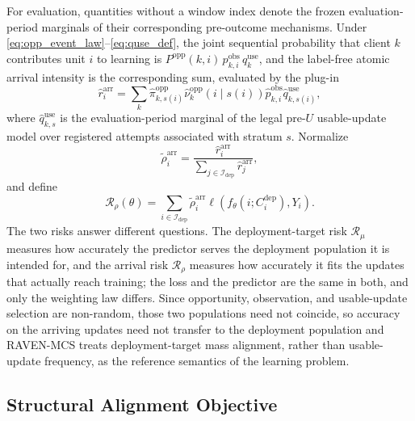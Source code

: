 \documentclass[letterpaper,journal]{IEEEtran}
\begin{document}
For evaluation, quantities without a window index denote the frozen
evaluation-period marginals of their corresponding pre-outcome mechanisms.
Under \eqref{eq:opp_event_law}--\eqref{eq:quse_def}, the joint sequential
probability that client $k$ contributes unit $i$ to learning is
$P^{\mathrm{opp}}(k,i)\,p^{\mathrm{obs}}_{k,i}\,q^{\mathrm{use}}_{k}$, and the
label-free atomic arrival intensity is the corresponding sum, evaluated by the
plug-in
\begin{equation}
 \widehat r_i^{\mathrm{arr}}
 =
 \sum_k
 \widehat\pi^{\mathrm{opp}}_{k,s(i)}
 \widehat\nu^{\mathrm{opp}}_{k}(i\mid s(i))
 \widehat p^{\mathrm{obs}}_{k,i}
 \widehat q^{\mathrm{use}}_{k,s(i)},
 \label{eq:arrival_intensity}
\end{equation}
where $\widehat q^{\mathrm{use}}_{k,s}$ is the evaluation-period marginal of the
legal pre-$U$ usable-update model over registered attempts associated with
stratum $s$.  Normalize
\begin{equation}
 \widetilde\rho_i^{\mathrm{arr}}
 =
 \frac{\widehat r_i^{\mathrm{arr}}}
 {\sum_{j\in\mathcal{I}_{\mathrm{dep}}}\widehat r_j^{\mathrm{arr}}},
 \label{eq:arrival_distribution}
\end{equation}
and define
\begin{equation}
 \mathcal{R}_{\rho}(\theta)
 =
 \sum_{i\in\mathcal{I}_{\mathrm{dep}}}
 \widetilde\rho_i^{\mathrm{arr}}
 \ell\!\left(
 f_{\theta}(i;C_i^{\mathrm{dep}}),Y_i
 \right).
 \label{eq:arrival_risk}
\end{equation}
The two risks answer different questions.  The deployment-target risk
$\mathcal{R}_{\mu}$ measures how accurately the predictor serves the deployment
population it is intended for, and the arrival risk $\mathcal{R}_{\rho}$ measures
how accurately it fits the updates that actually reach training; the loss and the
predictor are the same in both, and only the weighting law differs.  Since
opportunity, observation, and usable-update selection are non-random, those two
populations need not coincide, so accuracy on the arriving updates need not
transfer to the deployment population and RAVEN-MCS treats deployment-target mass
alignment, rather than usable-update frequency, as the reference semantics of the
learning problem.

\subsection{Structural Alignment Objective}
\label{subsec:design_objective}
\label{subsec:equivalence_band}
\end{document}

